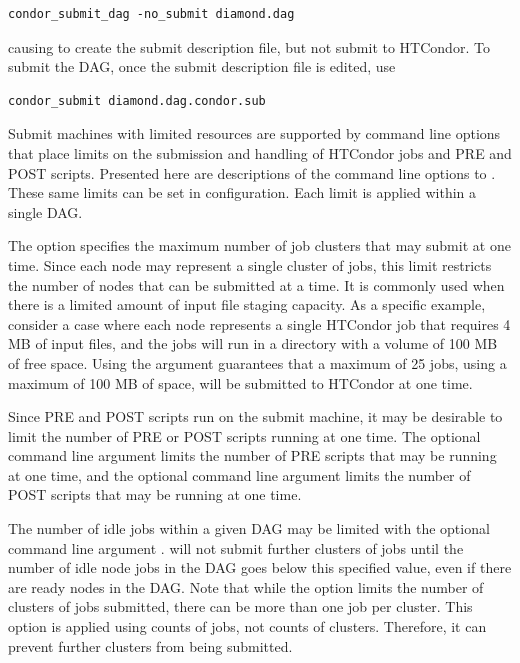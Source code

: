 \begin{verbatim}
condor_submit_dag -no_submit diamond.dag
\end{verbatim}
causing  to create the submit description file,
but not submit  to HTCondor.
To submit the DAG, once the submit description file is edited,
use

\begin{verbatim}
condor_submit diamond.dag.condor.sub
\end{verbatim}

Submit machines with limited resources are supported by
command line options that place limits on the submission and handling 
of HTCondor jobs and PRE and POST scripts. 
Presented here are descriptions of the command line options
to .
These same limits can be set in configuration.
Each limit is applied within a single DAG.

The  option 
specifies the maximum number of job clusters that  may
submit at one time.
Since each node may represent a single cluster of jobs,
this limit restricts the number of nodes that can be submitted at a time.
It is commonly used when
there is a limited amount of input file staging capacity.
As a specific example, consider a case where each node represents
a single HTCondor job that requires 4 MB of input files,
and the jobs will run in a directory with a volume of 100 MB
of free space.
Using the argument  guarantees that a maximum
of 25 jobs, using a maximum of 100 MB of space,
will be submitted to HTCondor at one time.

Since PRE and POST scripts run on the submit machine,
it may be desirable to limit the number of PRE or POST scripts running
at one time.
The optional  command line argument limits the number of PRE
scripts that may be running at one time,
and the optional  command line argument limits the number of POST
scripts that may be running at one time.

The number of idle jobs within a given DAG may be limited with
the optional command line argument . 
 will not submit further clusters of jobs 
until the number of idle node jobs in the DAG goes below this
specified value,
even if there are ready nodes in the DAG.
Note that while the  option limits the number of clusters
of jobs submitted,
there can be more than one job per cluster.
This  option is applied using counts of jobs,
not counts of clusters.
Therefore, it can prevent further clusters from being submitted.

